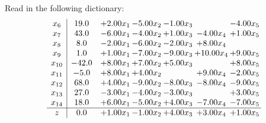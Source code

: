 \documentclass[9pt]{article}
\begin{document}
Read in the following dictionary:
\[\begin{array}{c| c c@{\hskip 2pt} c@{\hskip 2pt} c@{\hskip 2pt} c@{\hskip 2pt} c@{\hskip 2pt} }
 x_{6}   &  19.0 & +  2.00 x_{1} & -5.00 x_{2} & -1.00 x_{3} &   & -4.00 x_{5}\\
 x_{7}   &  43.0 & -6.00 x_{1} & -4.00 x_{2} & +  1.00 x_{3} & -4.00 x_{4} & +  1.00 x_{5}\\
 x_{8}   &  8.0 & -2.00 x_{1} & -6.00 x_{2} & -2.00 x_{3} & +  8.00 x_{4} &   \\
 x_{9}   &  1.0 & +  1.00 x_{1} & -7.00 x_{2} & -9.00 x_{3} & + 10.00 x_{4} & +  9.00 x_{5}\\
 x_{10}   &  -42.0 & +  8.00 x_{1} & +  7.00 x_{2} & +  5.00 x_{3} &   & +  8.00 x_{5}\\
 x_{11}   &  -5.0 & +  8.00 x_{1} & +  4.00 x_{2} &   & +  9.00 x_{4} & -2.00 x_{5}\\
 x_{12}   &  68.0 & +  4.00 x_{1} & -9.00 x_{2} & -8.00 x_{3} & -8.00 x_{4} & -9.00 x_{5}\\
 x_{13}   &  27.0 & -3.00 x_{1} & -4.00 x_{2} & -3.00 x_{3} &   & +  3.00 x_{5}\\
 x_{14}   &  18.0 & +  6.00 x_{1} & -5.00 x_{2} & +  4.00 x_{3} & -7.00 x_{4} & -7.00 x_{5}\\
\hline
z    &  0.0 & +  1.00 x_{1} & -1.00 x_{2} & +  4.00 x_{3} & +  3.00 x_{4} & +  1.00 x_{5}\\
\end{array}\]
\end{document}
